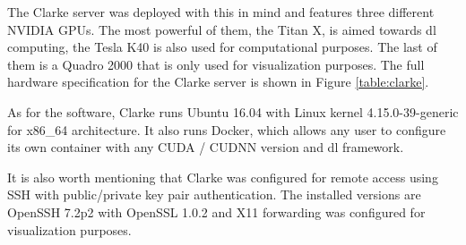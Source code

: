 The Clarke server was deployed with this in mind and features three different NVIDIA GPUs. The most powerful of them, the Titan X, is aimed towards \gls{dl} computing, the Tesla K40 is also used for computational purposes. The last of them is a Quadro 2000 that is only used for visualization purposes. The full hardware specification for the Clarke server is shown in Figure \ref{table:clarke}.

As for the software, Clarke runs Ubuntu 16.04 with Linux kernel 4.15.0-39-generic for x86\_64 architecture. It also runs Docker, which allows any user to configure its own container with any CUDA / CUDNN version and \gls{dl} framework.

It is also worth mentioning that Clarke was configured for remote access using SSH with public/private key pair authentication. The installed versions are OpenSSH 7.2p2 with OpenSSL 1.0.2 and X11 forwarding was configured for visualization purposes.

